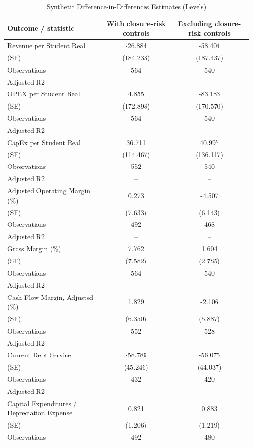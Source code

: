 \begin{table}[!htbp]
\centering
\caption{Synthetic Difference-in-Differences Estimates (Levels)}
\label{tab:sdid_levels}
\begin{tabular}{lcc}
\toprule
Outcome / statistic & With closure-risk controls & Excluding closure-risk controls \\
\midrule
Revenue per Student Real & -26.884 & -58.404 \\
(SE) & (184.233) & (187.437) \\
Observations & 564 & 540 \\
Adjusted R2 & -- & -- \\
OPEX per Student Real & 4.855 & -83.183 \\
(SE) & (172.898) & (170.570) \\
Observations & 564 & 540 \\
Adjusted R2 & -- & -- \\
CapEx per Student Real & 36.711 & 40.997 \\
(SE) & (114.467) & (136.117) \\
Observations & 552 & 540 \\
Adjusted R2 & -- & -- \\
Adjusted Operating Margin (\%) & 0.273 & -4.507 \\
(SE) & (7.633) & (6.143) \\
Observations & 492 & 468 \\
Adjusted R2 & -- & -- \\
Gross Margin (\%) & 7.762 & 1.604 \\
(SE) & (7.582) & (2.785) \\
Observations & 564 & 540 \\
Adjusted R2 & -- & -- \\
Cash Flow Margin, Adjusted (\%) & 1.829 & -2.106 \\
(SE) & (6.350) & (5.887) \\
Observations & 552 & 528 \\
Adjusted R2 & -- & -- \\
Current Debt Service & -58.786 & -56.075 \\
(SE) & (45.246) & (44.037) \\
Observations & 432 & 420 \\
Adjusted R2 & -- & -- \\
Capital Expenditures / Depreciation Expense & 0.821 & 0.883 \\
(SE) & (1.206) & (1.219) \\
Observations & 492 & 480 \\

\end{tabular}
\end{table}
